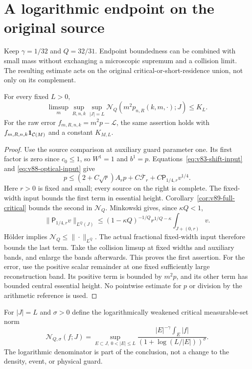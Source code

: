 \section{A logarithmic endpoint on the original source}
\label{sec:v89-logarithmic}
Keep $\gamma=1/32$ and $Q=32/31$. Endpoint boundedness can be
combined with small mass without exchanging a microscopic supremum
and a collision limit. The resulting estimate acts on the original
critical-or-short-residence union, not only on its complement.

\begin{proposition}
\label{prop:v89-density-bound}
For every fixed $L>0$,
\begin{equation}\label{eq:v89-density-bound}
 \limsup_m\sup_{R,n,k}\sup_{|J|=L}
                      \mathcal N_Q(m^2p_{n,R}(k,m,\cdot);J)\le K_L.
\end{equation}
For the raw error $f_{m,R,n,k}=m^2p-\mathcal L$, the same assertion
holds with $f_{m,R,n,k}\mathbf1_{\mathcal C(M)}$ and a constant $K_{M,L}$.
\end{proposition}
\begin{proof}
Use the source comparison at auxiliary guard parameter one. Its
first factor is zero since $c_0\le1$, so $W^1=1$ and $b^1=p$.
Equations~\eqref{eq:v83-shift-input} and
\eqref{eq:v88-optical-input} give
\[
 p\le(2+C\sqrt r)A_rp+C\overline{\mathcal F}_r
                         +C\mathsf P_{1/4,r}v^{1/4}.
\]
Here $r>0$ is fixed and small; every source on the right is complete.
The fixed-width input bounds the first term in essential height.
Corollary~\ref{cor:v89-full-critical} bounds the second in
$\mathcal N_Q$. Minkowski gives, since $\kappa Q<1$,
\[
 \|\mathsf P_{1/4,r}v\|_{L^Q(J)}
 \le (1-\kappa Q)^{-1/Q}r^{1/Q-\kappa}
                                      \int_{J+(0,r)}v.
\]
H\"older implies $\mathcal N_Q\le\|\cdot\|_{L^Q}$.
The actual fractional fixed-width input therefore bounds the last
term. Take the collision limsup at fixed widths and auxiliary bands,
and enlarge the bands afterwards. This proves the first assertion.
For the error, use the positive scalar remainder at one fixed
sufficiently large reconstruction band. Its positive term is bounded
by $m^2p$, and its other term has bounded central essential height.
No pointwise estimate for $p$ or division by the arithmetic reference
is used.
\end{proof}

For $|J|=L$ and $\sigma>0$ define the logarithmically weakened
critical measurable-set norm
\begin{equation}\label{eq:v89-log-norm}
 \mathcal N_{Q,\sigma}(f;J)
 =\sup_{E\subset J,\ 0<|E|\le L}
 \frac{|E|^{-\gamma}\int_E|f|}
                       {(1+\log(L/|E|))^\sigma}.
\end{equation}
The logarithmic denominator is part of the conclusion, not a
change to the density, event, or physical guard.

